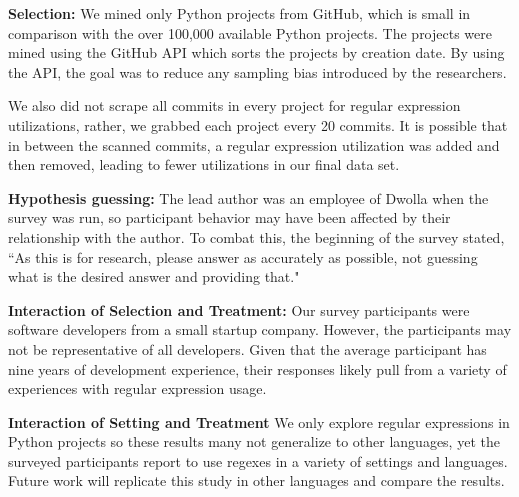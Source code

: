 \documentclass{sig-alternate}
\begin{document}
\textbf{Selection:} We mined only  Python projects from GitHub, which is  small in comparison with the over 100,000 available Python projects. The projects were mined using the GitHub API which sorts the projects by creation date. By using the API, the goal was to reduce any sampling bias introduced by the researchers.

We also did not scrape all commits in every project for regular expression utilizations, rather, we grabbed each project every 20 commits. It is possible that in between the scanned commits, a regular expression utilization was added and then removed, leading to fewer utilizations in our final data set.



\textbf{Hypothesis guessing:} The lead author was an employee of Dwolla when the survey was run, so participant behavior may have been affected by their relationship with the author. To combat this, the beginning of the survey stated, ``As this is for research, please answer as accurately as possible, not guessing what is the desired answer and providing that."


\textbf{Interaction of Selection and Treatment:} Our survey participants were software developers from a small startup company. However, the participants may not be representative of all developers. Given that the average participant has nine years of development experience, their responses likely pull from a variety of experiences with regular expression usage.

\textbf{Interaction of Setting and Treatment}
We only explore regular expressions in Python projects so these results many not generalize to other languages, yet the surveyed participants report to use regexes in a  variety of settings and languages. Future work will replicate this study in other languages and compare the results.



%
%
%
\end{document}
